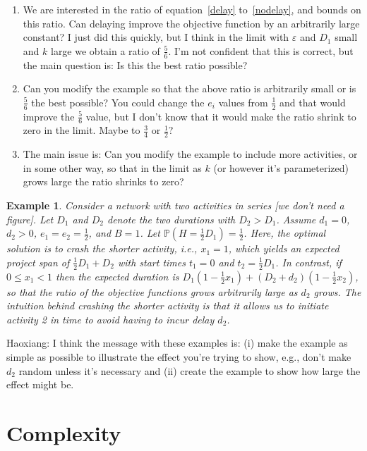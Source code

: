 \documentclass[11pt]{article}
\newtheorem{example}{Example}
\renewcommand{\P}{{\mathbb P}}
\begin{document}
\begin{enumerate}
\item We are interested in the ratio of equation~\eqref{delay} to~\eqref{nodelay}, and bounds on this ratio. Can delaying improve the objective function by an arbitrarily large constant? I just did this quickly, but I think in the limit with $\varepsilon$ and $D_1$ small and $k$ large we obtain a ratio of $\frac{5}{6}$. I'm not confident that this is correct, but the main question is: Is this the best ratio possible? 
\item Can you modify the example so that the above ratio is arbitrarily small or is $\frac{5}{6}$ the best possible? You could change the $e_i$ values from $\frac{1}{2}$ and that would improve the $\frac{5}{6}$ value, but I don't know that it would make the ratio shrink to zero in the limit. Maybe to $\frac{3}{4}$ or $\frac{1}{2}$? 
\item The main issue is: Can you modify the example to include more activities, or in some other way, so that in the limit as $k$ (or however it's parameterized) grows large the ratio shrinks to zero? 
\end{enumerate}

\newpage

\begin{example}\label{example2} 
Consider a network with two activities in series [we don't need a figure]. Let $D_1$ and $D_2$ denote the two durations with $D_2 > D_1$. Assume $d_1=0$, $d_2 > 0$, $e_1=e_2=\frac{1}{2}$, and $B=1$. Let $\P(H=\frac{1}{2}D_1)=\frac{1}{2}$. Here, the optimal solution is to crash the shorter activity, i.e., $x_1=1$, which yields an expected project span of $\frac{1}{2}D_1 + D_2$ with start times $t_1=0$ and $t_2=\frac{1}{2}D_1$. In contrast, if $0 \le x_1 < 1$ then the expected duration is $D_1 (1-\frac{1}{2} x_1) + (D_2 + d_2)(1-\frac{1}{2} x_2)$, so that the ratio of the objective functions grows arbitrarily large as $d_2$ grows. The intuition behind crashing the shorter activity is that it allows us to initiate activity 2 in time to avoid having to incur delay $d_2$.
\end{example}
Haoxiang: I think the message with these examples is: (i) make the example as simple as possible to illustrate the effect you're trying to show, e.g., don't make $d_2$ random unless it's necessary and (ii) create the example to show how large the effect might be. \medskip

\section*{Complexity} 
\end{document}
